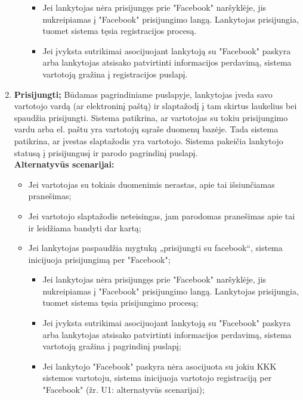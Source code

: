 \documentclass{VUMIFPSkursinis}
\begin{document}
\begin{enumerate}[label=\textbf{U\arabic*.}]
\begin{itemize}
						\begin{itemize}
							\item Jei lankytojas nėra prisijungęs prie "Facebook" naršyklėje, jis nukreipiamas į "Facebook" prisijungimo langą. 
								Lankytojas prisijungia, tuomet sistema tęsia registracijos procesą.
							\item Jei įvyksta sutrikimai asocijuojant lankytoją su "Facebook" paskyra arba lankytojas atsisako patvirtinti informacijos perdavimą,
								sistema vartotoją gražina į registracijos puslapį.
						\end{itemize}
				\end{itemize}
			\item \textbf{Prisijungti;}
				Būdamas pagrindiniame puslapyje, lankytojas įveda savo vartotojo vardą (ar elektroninį paštą) ir slaptažodį į tam skirtus laukelius bei spaudžia prisijungti.
				Sistema patikrina, ar vartotojas su tokiu prisijungimo vardu arba el. paštu yra vartotojų sąraše duomenų bazėje.
				Tada sistema patikrina, ar įvestas slaptažodis yra vartotojo. Sistema pakeičia lankytojo statusą į prisijungusį ir parodo pagrindinį puslapį.\\
				\textbf{Alternatyvūs scenarijai:}
				\begin{itemize}
					\item Jei vartotojas su tokiais duomenimis nerastas, apie tai išsiunčiamas pranešimas;
					\item Jei vartotojo slaptažodis neteisingas, jam parodomas pranešimas apie tai ir leidžiama bandyti dar kartą;
					\item Jei lankytojas paspaudžia mygtuką „prisijungti su facebook“, sistema inicijuoja prisijungimą per "Facebook";
						\begin{itemize}
							\item Jei lankytojas nėra prisijungęs prie "Facebook" naršyklėje, jis nukreipiamas į "Facebook" prisijungimo langą. 
								Lankytojas prisijungia, tuomet sistema tęsia prisijungimo procesą;
							\item Jei įvyksta sutrikimai asocijuojant lankytoją su "Facebook" paskyra arba lankytojas atsisako patvirtinti informacijos perdavimą,
								sistema vartotoją gražina į pagrindinį puslapį;
							\item Jei lankytojo "Facebook" paskyra nėra asocijuota su jokiu KKK sistemos vartotoju, sistema inicijuoja vartotojo registraciją per "Facebook" (žr. U1: alternatyvūs scenarijai);
						\end{itemize}
				\end{itemize}

\end{enumerate}
\end{document}
